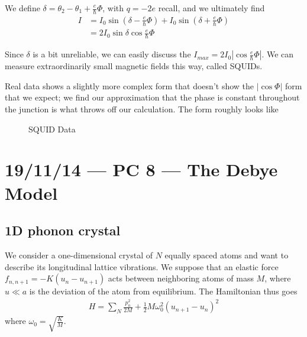 \documentclass[10pt]{report}
\newcommand{\abs}[1]{\left|#1\right|}
\begin{document}
\begin{enumerate}[1.]
        We define $\delta = \theta_2 - \theta_1 + \frac{e}{\hbar}\Phi$, with $q = -2e$ recall, and we ultimately find
        \begin{align}
            I &= I_0\sin\left( \delta - \frac{e}{\hbar}\Phi \right) + I_0\sin \left( \delta + \frac{e}{\hbar}\Phi \right)\\
            &= 2I_0\sin\delta\cos\frac{e}{\hbar}\Phi
        \end{align}

        Since $\delta$ is a bit unreliable, we can easily discuss the $I_{max} = 2I_0\abs{\cos\frac{e}{\hbar}\Phi}$. We can measure extraordinarily small magnetic fields this way, called SQUIDs.

        Real data shows a slightly more complex form that doesn't show the $\abs{\cos \Phi}$ form that we expect; we find our approximation that the phase is constant throughout the junction is what throws off our calculation. The form roughly looks like
        \begin{figure}[!h]
            \centering
            \caption{SQUID Data}
            \label{05.11.SQUID}
        \end{figure}
\end{enumerate}

\chapter{19/11/14 --- PC 8 --- The Debye Model}

\section{1D phonon crystal}

We consider a one-dimensional crystal of $N$ equally spaced atoms and want to describe its longitudinal lattice vibrations. We suppose that an elastic force $f_{n, n+1} = -K\left( u_n - u_{n+1} \right)$ acts between neighboring atoms of mass $M$, where $u \ll a$ is the deviation of the atom from equilibrium. The Hamiltonian thus goes
\begin{align}
    H = \sum\limits_{N}^{}\frac{p_n^2}{2M} + \frac{1}{2}M\omega_0^2\left( u_{n+1} - u_n \right)^2
\end{align}
where $\omega_0 = \sqrt{\frac{K}{M}}$. 
\end{document}
